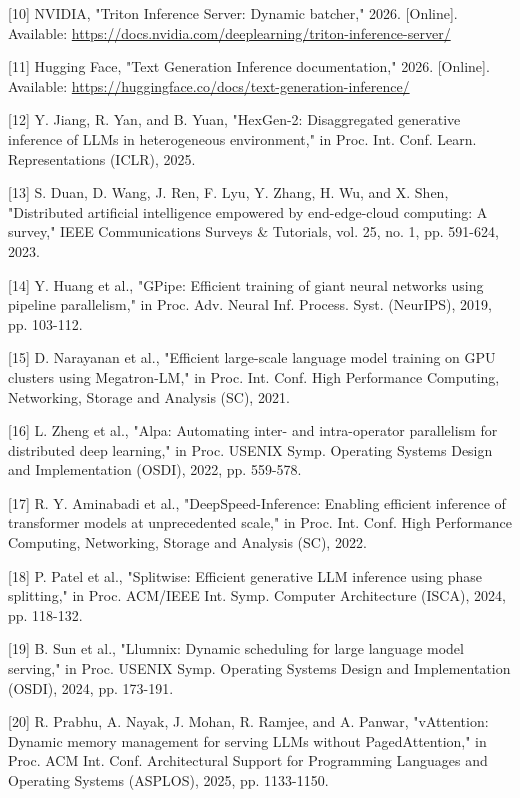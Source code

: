 \documentclass[a4paper,10pt]{ctexart}
\begin{document}
[10] NVIDIA, "Triton Inference Server: Dynamic batcher," 2026. [Online]. Available: \href{https://docs.nvidia.com/deeplearning/triton-inference-server/}{https://docs.nvidia.com/deeplearning/triton-inference-server/}


[11] Hugging Face, "Text Generation Inference documentation," 2026. [Online]. Available: \href{https://huggingface.co/docs/text-generation-inference/}{https://huggingface.co/docs/text-generation-inference/}


[12] Y. Jiang, R. Yan, and B. Yuan, "HexGen-2: Disaggregated generative inference of LLMs in heterogeneous environment," in Proc. Int. Conf. Learn. Representations (ICLR), 2025.


[13] S. Duan, D. Wang, J. Ren, F. Lyu, Y. Zhang, H. Wu, and X. Shen, "Distributed artificial intelligence empowered by end-edge-cloud computing: A survey," IEEE Communications Surveys \& Tutorials, vol. 25, no. 1, pp. 591-624, 2023.


[14] Y. Huang et al., "GPipe: Efficient training of giant neural networks using pipeline parallelism," in Proc. Adv. Neural Inf. Process. Syst. (NeurIPS), 2019, pp. 103-112.


[15] D. Narayanan et al., "Efficient large-scale language model training on GPU clusters using Megatron-LM," in Proc. Int. Conf. High Performance Computing, Networking, Storage and Analysis (SC), 2021.


[16] L. Zheng et al., "Alpa: Automating inter- and intra-operator parallelism for distributed deep learning," in Proc. USENIX Symp. Operating Systems Design and Implementation (OSDI), 2022, pp. 559-578.


[17] R. Y. Aminabadi et al., "DeepSpeed-Inference: Enabling efficient inference of transformer models at unprecedented scale," in Proc. Int. Conf. High Performance Computing, Networking, Storage and Analysis (SC), 2022.


[18] P. Patel et al., "Splitwise: Efficient generative LLM inference using phase splitting," in Proc. ACM/IEEE Int. Symp. Computer Architecture (ISCA), 2024, pp. 118-132.


[19] B. Sun et al., "Llumnix: Dynamic scheduling for large language model serving," in Proc. USENIX Symp. Operating Systems Design and Implementation (OSDI), 2024, pp. 173-191.


[20] R. Prabhu, A. Nayak, J. Mohan, R. Ramjee, and A. Panwar, "vAttention: Dynamic memory management for serving LLMs without PagedAttention," in Proc. ACM Int. Conf. Architectural Support for Programming Languages and Operating Systems (ASPLOS), 2025, pp. 1133-1150.
\end{document}
